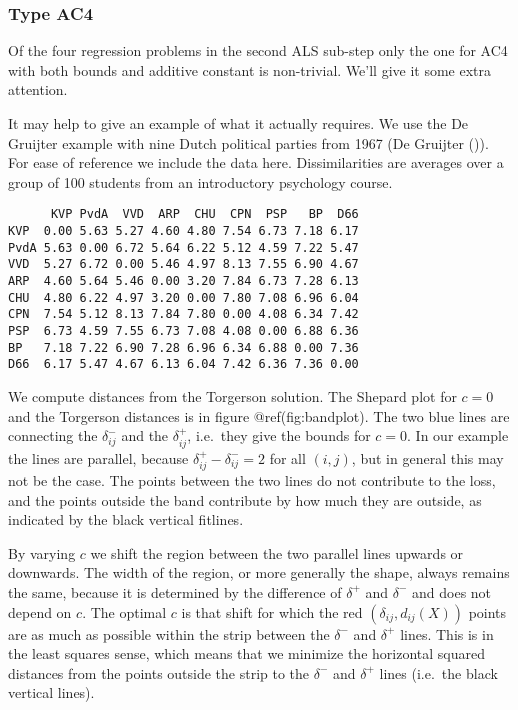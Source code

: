 \documentclass[
  12pt,
  letterpaper,
  DIV=11,
  numbers=noendperiod]{scrartcl}
\begin{document}
\subsubsection{Type AC4}\label{type-ac4}

Of the four regression problems in the second ALS sub-step only the one
for AC4 with both bounds and additive constant is non-trivial. We'll
give it some extra attention.

It may help to give an example of what it actually requires. We use the
De Gruijter example with nine Dutch political parties from 1967 (De
Gruijter ()). For ease of reference we
include the data here. Dissimilarities are averages over a group of 100
students from an introductory psychology course.

\begin{verbatim}
      KVP PvdA  VVD  ARP  CHU  CPN  PSP   BP  D66
KVP  0.00 5.63 5.27 4.60 4.80 7.54 6.73 7.18 6.17
PvdA 5.63 0.00 6.72 5.64 6.22 5.12 4.59 7.22 5.47
VVD  5.27 6.72 0.00 5.46 4.97 8.13 7.55 6.90 4.67
ARP  4.60 5.64 5.46 0.00 3.20 7.84 6.73 7.28 6.13
CHU  4.80 6.22 4.97 3.20 0.00 7.80 7.08 6.96 6.04
CPN  7.54 5.12 8.13 7.84 7.80 0.00 4.08 6.34 7.42
PSP  6.73 4.59 7.55 6.73 7.08 4.08 0.00 6.88 6.36
BP   7.18 7.22 6.90 7.28 6.96 6.34 6.88 0.00 7.36
D66  6.17 5.47 4.67 6.13 6.04 7.42 6.36 7.36 0.00
\end{verbatim}

We compute distances from the Torgerson solution. The Shepard plot for
\(c=0\) and the Torgerson distances is in figure @ref(fig:bandplot). The
two blue lines are connecting the \(\delta_{ij}^-\) and the
\(\delta_{ij}^+\), i.e.~they give the bounds for \(c=0\). In our example
the lines are parallel, because \(\delta_{ij}^+-\delta_{ij}^-=2\) for
all \((i,j)\), but in general this may not be the case. The points
between the two lines do not contribute to the loss, and the points
outside the band contribute by how much they are outside, as indicated
by the black vertical fitlines.

By varying \(c\) we shift the region between the two parallel lines
upwards or downwards. The width of the region, or more generally the
shape, always remains the same, because it is determined by the
difference of \(\delta^+\) and \(\delta^-\) and does not depend on
\(c\). The optimal \(c\) is that shift for which the red
\((\delta_{ij},d_{ij}(X))\) points are as much as possible within the
strip between the \(\delta^-\) and \(\delta^+\) lines. This is in the
least squares sense, which means that we minimize the horizontal squared
distances from the points outside the strip to the \(\delta^-\) and
\(\delta^+\) lines (i.e.~the black vertical lines).
\end{document}
